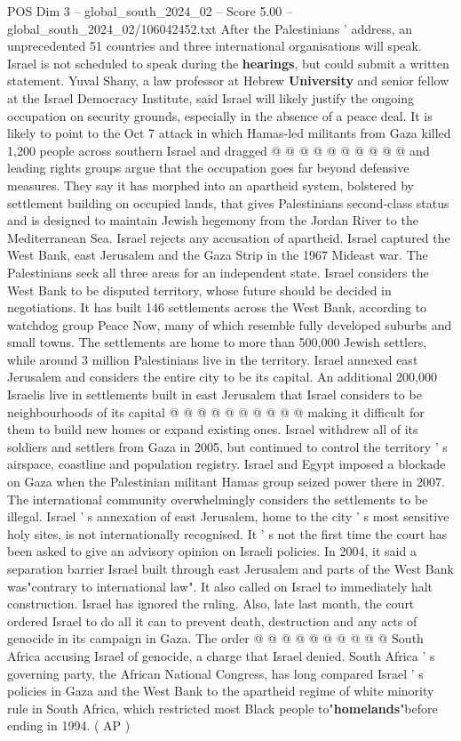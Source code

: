 \begin{textsample}{POS Dim 3 – global\_south\_2024\_02 – Score 5.00 – global\_south\_2024\_02/106042452.txt}
After the Palestinians ' address, an unprecedented 51 countries and three international organisations will speak.
Israel is not scheduled to speak during the \textbf{hearings}, but could submit a written statement.
Yuval Shany, a law professor at Hebrew \textbf{University} and senior fellow at the Israel Democracy Institute, said Israel will likely justify the ongoing occupation on security grounds, especially in the absence of a peace deal.
It is likely to point to the Oct 7 attack in which Hamas-led militants from Gaza killed 1,200 people across southern Israel and dragged @ @ @ @ @ @ @ @ @ @ and leading rights groups argue that the occupation goes far beyond defensive measures.
They say it has morphed into an apartheid system, bolstered by settlement building on occupied lands, that gives Palestinians second-class status and is designed to maintain Jewish hegemony from the Jordan River to the Mediterranean Sea.
Israel rejects any accusation of apartheid.
Israel captured the West Bank, east Jerusalem and the Gaza Strip in the 1967 Mideast war.
The Palestinians seek all three areas for an independent state.
Israel considers the West Bank to be disputed territory, whose future should be decided in negotiations.
It has built 146 settlements across the West Bank, according to watchdog group Peace Now, many of which resemble fully developed suburbs and small towns.
The settlements are home to more than 500,000 Jewish settlers, while around 3 million Palestinians live in the territory.
Israel annexed east Jerusalem and considers the entire city to be its capital.
An additional 200,000 Israelis live in settlements built in east Jerusalem that Israel considers to be neighbourhoods of its capital @ @ @ @ @ @ @ @ @ @ making it difficult for them to build new homes or expand existing ones.
Israel withdrew all of its soldiers and settlers from Gaza in 2005, but continued to control the territory ' s airspace, coastline and population registry.
Israel and Egypt imposed a blockade on Gaza when the Palestinian militant Hamas group seized power there in 2007.
The international community overwhelmingly considers the settlements to be illegal.
Israel ' s annexation of east Jerusalem, home to the city ' s most sensitive holy sites, is not internationally recognised.
It ' s not the first time the court has been asked to give an advisory opinion on Israeli policies.
In 2004, it said a separation barrier Israel built through east Jerusalem and parts of the West Bank was"contrary to international law".
It also called on Israel to immediately halt construction.
Israel has ignored the ruling.
Also, late last month, the court ordered Israel to do all it can to prevent death, destruction and any acts of genocide in its campaign in Gaza.
The order @ @ @ @ @ @ @ @ @ @ South Africa accusing Israel of genocide, a charge that Israel denied.
South Africa ' s governing party, the African National Congress, has long compared Israel ' s policies in Gaza and the West Bank to the apartheid regime of white minority rule in South Africa, which restricted most Black people to"\textbf{homelands}"before ending in 1994. ( AP )

\end{textsample}

